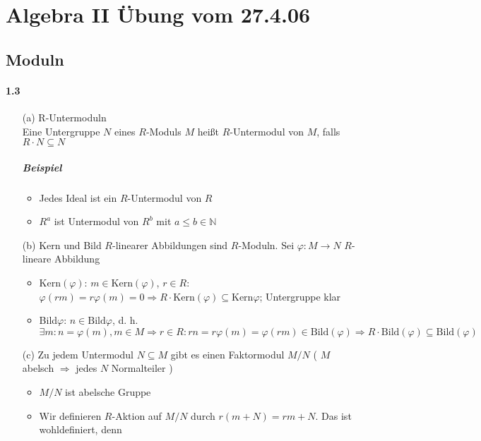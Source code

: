 \documentclass{article}
\author{Franziska Hinkelmann}
\begin{document}
\section* {Algebra II Übung vom 27.4.06}
\subsection* {Moduln}

\paragraph{1.3}
	\begin{enumerate}
		\item[(a)] R-Untermoduln \\
			Eine Untergruppe $N$ eines $R$-Moduls $M$ heißt $R$-Untermodul von $M$, falls $R \cdot N \subseteq N$\\
			\subparagraph{Beispiel}
				\begin{itemize}
					\item Jedes Ideal ist ein $R$-Untermodul von $R$
					\item $R^a$ ist Untermodul von $R^b$ mit $a \leq b \in \mathbb N$
				\end{itemize}
		\item[(b)] Kern und Bild $R$-linearer Abbildungen sind $R$-Moduln. Sei $\varphi: M \rightarrow N$ $R$-lineare Abbildung
			\begin{itemize}
				\item Kern$(\varphi)$: $m \in \mbox{Kern} (\varphi)$, $r \in R$:\\
					$\varphi(rm) = r\varphi(m) = 0 \Rightarrow R \cdot \mbox{Kern} ( \varphi ) \subseteq \mbox{Kern} \varphi$; 
					Untergruppe klar
				\item Bild$\varphi$: $n \in \mbox{Bild} \varphi $, d. h. $\exists m: n = \varphi (m), m \in M \Rightarrow r \in R:
					rn = r \varphi(m) = \varphi(rm) \in \mbox{Bild} (\varphi)  \Rightarrow R \cdot \mbox{Bild} 
					(\varphi) \subseteq \mbox{Bild} (\varphi)$
			\end{itemize}
		\item[(c)] Zu jedem Untermodul $N \subseteq M$ gibt es einen Faktormodul $M/N$ ( $M$ abelsch $\Rightarrow$ jedes $N$ Normalteiler )
			\begin{itemize}
				\item $M/N$ ist abelsche Gruppe
				\item Wir definieren $R$-Aktion auf $M/N$ durch $r(m + N) = rm + N$. Das ist wohldefiniert, denn\\

\end{itemize}
\end{enumerate}
\end{document}
